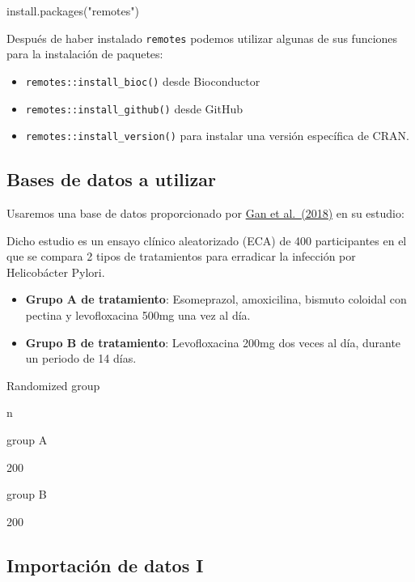 \documentclass[
]{book}
\newenvironment{Shaded}{\begin{snugshade}}{\end{snugshade}}
\newcommand{\FunctionTok}[1]{\textcolor[rgb]{0.00,0.00,0.00}{#1}}
\newcommand{\NormalTok}[1]{#1}
\newcommand{\StringTok}[1]{\textcolor[rgb]{0.31,0.60,0.02}{#1}}
\begin{document}
\begin{Shaded}
\begin{Highlighting}[]
\FunctionTok{install.packages}\NormalTok{(}\StringTok{"remotes"}\NormalTok{)}
\end{Highlighting}
\end{Shaded}

Después de haber instalado \texttt{remotes} podemos utilizar algunas de sus funciones para la instalación de paquetes:

\begin{itemize}
\item
  \texttt{remotes::install\_bioc()} desde Bioconductor
\item
  \texttt{remotes::install\_github()} desde GitHub
\item
  \texttt{remotes::install\_version()} para instalar una versión específica de CRAN.
\end{itemize}

\hypertarget{bases-de-datos-a-utilizar}{%
\subsection{Bases de datos a utilizar}\label{bases-de-datos-a-utilizar}}

Usaremos una base de datos proporcionado por \href{https://www.nature.com/articles/s41598-018-27482-2}{Gan et al.~(2018)} en su estudio:

Dicho estudio es un ensayo clínico aleatorizado (ECA) de 400 participantes en el que se compara 2 tipos de tratamientos para erradicar la infección por Helicobácter Pylori.

\begin{itemize}
\item
  \textbf{Grupo A de tratamiento}: Esomeprazol, amoxicilina, bismuto coloidal con pectina y levofloxacina 500mg una vez al día.
\item
  \textbf{Grupo B de tratamiento}: Levofloxacina 200mg dos veces al día, durante un periodo de 14 días.
\end{itemize}

Randomized group

n

group A

200

group B

200

\hypertarget{importaciuxf3n-de-datos-i}{%
\subsection{Importación de datos I}\label{importaciuxf3n-de-datos-i}}
\end{document}
